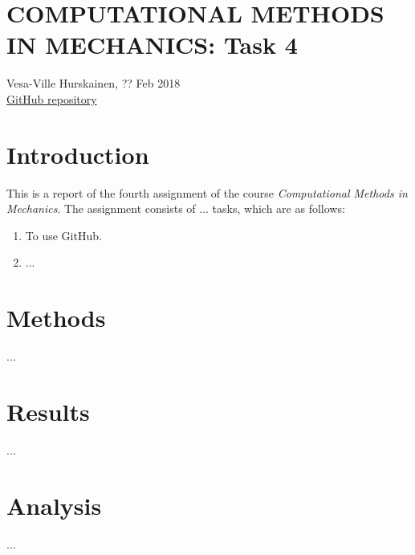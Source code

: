 \documentclass{article}
\begin{document}
	\section*{COMPUTATIONAL METHODS IN MECHANICS: Task 4}
	Vesa-Ville Hurskainen, ?? Feb 2018\\
	\href{https://github.com/VesaVilleHurskainen/cmim2018}{GitHub repository}

	\section*{Introduction}
	This is a report of the fourth assignment of the course \textit{Computational Methods in Mechanics}. The assignment consists of ... tasks, which are as follows:
	
	\begin{enumerate}
		\setlength\itemsep{0pt}
		\item To use GitHub.
		\item ...
	\end{enumerate}

	\section*{Methods}
	...

	\section*{Results}
	...

	\section*{Analysis}
	...
	
\end{document}
